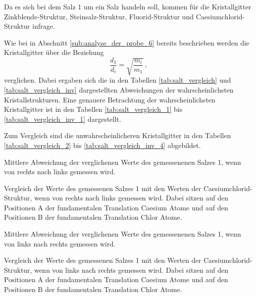Da es sich bei dem Salz 1 um ein Salz handeln soll,
kommen für die Kristallgitter Zinkblende-Struktur, Steinsalz-Struktur, Fluorid-Struktur und Caesiumchlorid-Struktur infrage.

Wie bei in Abschnitt \ref{sub:analyse_der_probe_6} bereits beschrieben werden die Kristallgitter über die Beziehung
\begin{equation*}
    \frac{d_1}{d_i} = \sqrt{\frac{m_i}{m_1}}\,,
\end{equation*}
verglichen.
Dabei ergaben sich die in den Tabellen \ref{tab:salt_vergleich} und \ref{tab:salt_vergleich_inv}
dargestellten Abweichungen der wahrscheinlichsten Kristallstrukturen.
Eine genauere Betrachtung der wahrscheinlichsten Kristallgitter ist in den Tabellen \ref{tab:salt_vergleich_1} bis \ref{tab:salt_vergleich_inv_1} dargestellt.

Zum Vergleich sind die unwahrscheinlicheren Kristallgitter in den Tabellen \ref{tab:salt_vergleich_2} bis \ref{tab:salt_vergleich_inv_4} abgebildet.

\begin{table}[!ht]
    \centering
    \caption{Mittlere Abweichung der verglichenen Werte des gemessenenen Salzes 1, wenn von rechts nach links gemessen wird.}
    
    \label{tab:salt_vergleich}
\end{table}
\begin{table}[!ht]
    \centering
    \caption{Vergleich der Werte des gemessenen Salzes 1 mit den Werten der Caesiumchlorid-Struktur, wenn von rechts nach links gemessen wird. Dabei sitzen auf den Positionen A der fundamentalen Translation Caesium Atome und auf den Positionen B der fundamentalen Translation Chlor Atome.}
    
    \label{tab:salt_vergleich_1}
\end{table}
\begin{table}[!ht]
    \centering
    \caption{Mittlere Abweichung der verglichenen Werte des gemessenenen Salzes 1, wenn von links nach rechts gemessen wird.}
    
    \label{tab:salt_vergleich_inv}
\end{table}
\begin{table}[!ht]
    \centering
    \caption{Vergleich der Werte des gemessenen Salzes 1 mit den Werten der Caesiumchlorid-Struktur, wenn von links nach rechts gemessen wird. Dabei sitzen auf den Positionen A der fundamentalen Translation Caesium Atome und auf den Positionen B der fundamentalen Translation Chlor Atome.}
    
    \label{tab:salt_vergleich_inv_1}
\end{table}

